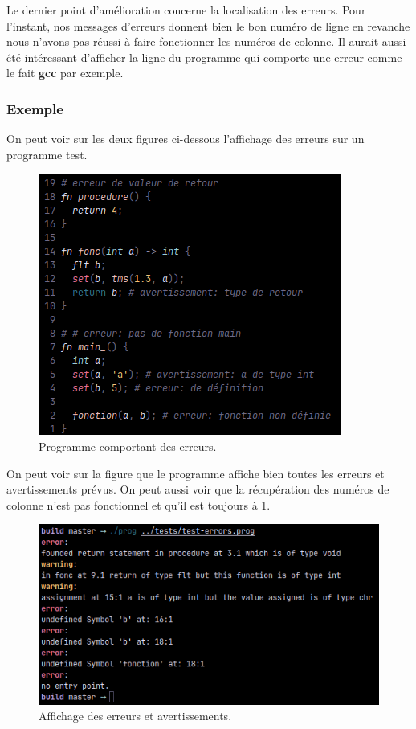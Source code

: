 \documentclass[a4paper]{article}%
\begin{document}
Le dernier point d'amélioration concerne la localisation des erreurs. Pour
l'instant, nos messages d'erreurs donnent bien le bon numéro de ligne en
revanche nous n'avons pas réussi à faire fonctionner les numéros de colonne. Il
aurait aussi été intéressant d'afficher la ligne du programme qui comporte une
erreur comme le fait \textbf{gcc} par exemple.\\

\subsubsection*{Exemple}

On peut voir sur les deux figures ci-dessous l'affichage des erreurs sur un
programme test.

\begin{figure}[h]
  \begin{center}
  \includegraphics[scale=0.7]{./img/err-prog.png}
  \caption{Programme comportant des erreurs.}
  \end{center}
\end{figure}

\clearpage
On peut voir sur la figure que le programme affiche bien toutes les erreurs et
avertissements prévus. On peut aussi voir que la récupération des numéros de
colonne n'est pas fonctionnel et qu'il est toujours à 1.

\begin{figure}[h]
  \begin{center}
  \includegraphics[scale=0.7]{./img/err-prog-out.png}
  \caption{Affichage des erreurs et avertissements.}
  \end{center}
\end{figure}
\end{document}
